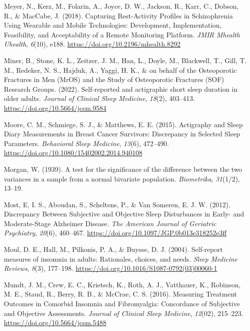 \documentclass[
]{article}
\newlength{\cslhangindent}
\newenvironment{CSLReferences}[2] %
 {\begin{list}{}{%
  \setlength{\itemindent}{0pt}
  \setlength{\leftmargin}{0pt}
  \setlength{\parsep}{0pt}
  \ifodd #1
   \setlength{\leftmargin}{\cslhangindent}
   \setlength{\itemindent}{-1\cslhangindent}
  \fi
  \setlength{\itemsep}{#2\baselineskip}}}
 {\end{list}}
\begin{document}
\begin{CSLReferences}{1}{0}
Meyer, N., Kerz, M., Folarin, A., Joyce, D. W., Jackson, R., Karr, C., Dobson, R., \& MacCabe, J. (2018). Capturing {Rest}-{Activity} {Profiles} in {Schizophrenia} {Using} {Wearable} and {Mobile} {Technologies}: {Development}, {Implementation}, {Feasibility}, and {Acceptability} of a {Remote} {Monitoring} {Platform}. \emph{JMIR Mhealth Uhealth}, \emph{6}(10), e188. \url{https://doi.org/10.2196/mhealth.8292}

Miner, B., Stone, K. L., Zeitzer, J. M., Han, L., Doyle, M., Blackwell, T., Gill, T. M., Redeker, N. S., Hajduk, A., Yaggi, H. K., \& on behalf of the Osteoporotic Fractures in Men (MrOS) and the Study of Osteoporotic Fractures (SOF) Research Groups. (2022). Self-reported and actigraphic short sleep duration in older adults. \emph{Journal of Clinical Sleep Medicine}, \emph{18}(2), 403--413. \url{https://doi.org/10.5664/jcsm.9584}

Moore, C. M., Schmiege, S. J., \& Matthews, E. E. (2015). Actigraphy and {Sleep} {Diary} {Measurements} in {Breast} {Cancer} {Survivors}: {Discrepancy} in {Selected} {Sleep} {Parameters}. \emph{Behavioral Sleep Medicine}, \emph{13}(6), 472--490. \url{https://doi.org/10.1080/15402002.2014.940108}

Morgan, W. (1939). A test for the significance of the difference between the two variances in a sample from a normal bivariate population. \emph{Biometrika}, \emph{31}(1/2), 13--19.

Most, E. I. S., Aboudan, S., Scheltens, P., \& Van Someren, E. J. W. (2012). Discrepancy {Between} {Subjective} and {Objective} {Sleep} {Disturbances} in {Early}- and {Moderate}-{Stage} {Alzheimer} {Disease}. \emph{The American Journal of Geriatric Psychiatry}, \emph{20}(6), 460--467. \url{https://doi.org/10.1097/JGP.0b013e318252e3ff}

Moul, D. E., Hall, M., Pilkonis, P. A., \& Buysse, D. J. (2004). {Self-report measures of insomnia in adults: Rationales, choices, and needs}. \emph{Sleep Medicine Reviews}, \emph{8}(3), 177--198. \url{https://doi.org/10.1016/S1087-0792(03)00060-1}

Mundt, J. M., Crew, E. C., Krietsch, K., Roth, A. J., Vatthauer, K., Robinson, M. E., Staud, R., Berry, R. B., \& McCrae, C. S. (2016). Measuring {Treatment} {Outcomes} in {Comorbid} {Insomnia} and {Fibromyalgia}: {Concordance} of {Subjective} and {Objective} {Assessments}. \emph{Journal of Clinical Sleep Medicine}, \emph{12}(02), 215--223. \url{https://doi.org/10.5664/jcsm.5488}


\end{CSLReferences}
\end{document}
